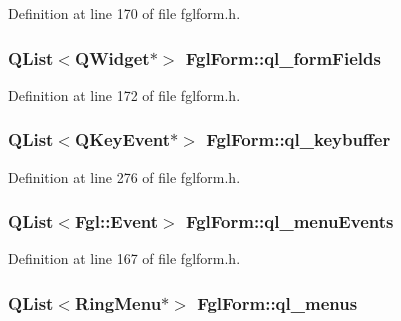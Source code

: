 Definition at line 170 of file fglform.h.

\hypertarget{classFglForm_ad0adbaabeb97d6fabd2a23f5ac5c0069}{
\subsubsection[{ql\_\-formFields}]{\setlength{\rightskip}{0pt plus 5cm}QList$<$QWidget$\ast$$>$ {\bf FglForm::ql\_\-formFields}}}
\label{classFglForm_ad0adbaabeb97d6fabd2a23f5ac5c0069}


Definition at line 172 of file fglform.h.

\hypertarget{classFglForm_a2164d9fc4e8c4be30d54ec2a99e881ea}{
\subsubsection[{ql\_\-keybuffer}]{\setlength{\rightskip}{0pt plus 5cm}QList$<$QKeyEvent$\ast$$>$ {\bf FglForm::ql\_\-keybuffer}}}
\label{classFglForm_a2164d9fc4e8c4be30d54ec2a99e881ea}


Definition at line 276 of file fglform.h.

\hypertarget{classFglForm_a0a20950e5d9deba35525fbcb7935f6f0}{
\subsubsection[{ql\_\-menuEvents}]{\setlength{\rightskip}{0pt plus 5cm}QList$<${\bf Fgl::Event}$>$ {\bf FglForm::ql\_\-menuEvents}}}
\label{classFglForm_a0a20950e5d9deba35525fbcb7935f6f0}


Definition at line 167 of file fglform.h.

\hypertarget{classFglForm_a587196a08706e03ec05f1fae4048f344}{
\subsubsection[{ql\_\-menus}]{\setlength{\rightskip}{0pt plus 5cm}QList$<${\bf RingMenu}$\ast$$>$ {\bf FglForm::ql\_\-menus}}}
\label{classFglForm_a587196a08706e03ec05f1fae4048f344}



